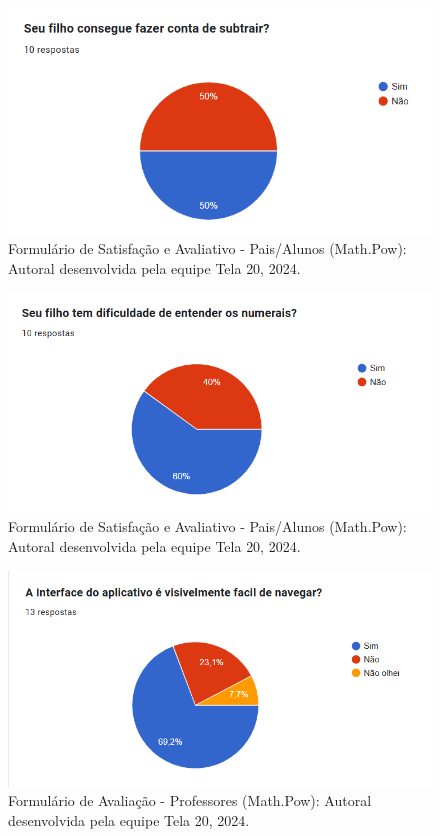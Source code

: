\documentclass[12pt, openany, oneside, a4paper, english, brazil]{abntex2}   %
\begin{document}
\begin{figure}
    \centering
    \includegraphics{figuras/Formulário Gráficos/Pais/15 seu filho consegue fazer conta de subtrair.png}
    \caption{Formulário de Satisfação e Avaliativo  - Pais/Alunos (Math.Pow):  Autoral desenvolvida pela equipe Tela 20, 2024.}
    \label{gráfico gerado pelo formulário}
\end{figure}

\begin{figure}
    \centering
    \includegraphics{figuras/Formulário Gráficos/Pais/16 Seu filho tem dificuldade de entender os numerais.png}
    \caption{Formulário de Satisfação e Avaliativo  - Pais/Alunos (Math.Pow):  Autoral desenvolvida pela equipe Tela 20, 2024.}
    \label{gráfico gerado pelo formulário}
\end{figure}

\begin{figure}
    \centering
    \includegraphics{figuras/Formulário Gráficos/Professores/1 A iterface.png}
    \caption{Formulário de Avaliação - Professores (Math.Pow):  Autoral desenvolvida pela equipe Tela 20, 2024.}
    \label{gráfico gerado pelo formulário}
\end{figure}
\end{document}

